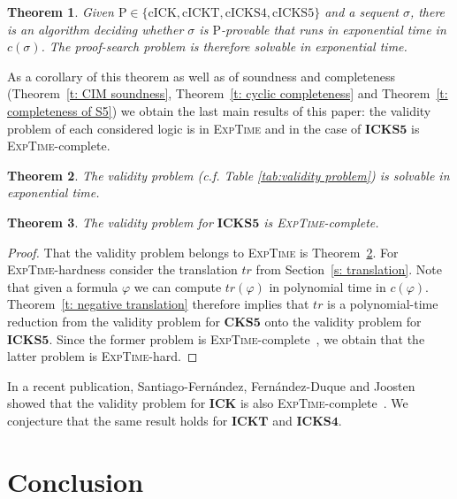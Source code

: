 \documentclass{myifcolog}
\newcommand{\hickp}{\mathrm{P}}
\newcommand{\cick}{\mathrm{cICK}}
\newcommand{\cickt}{\mathrm{cICKT}}
\newcommand{\cicks}{\mathrm{cICKS4}}
\newcommand{\cickss}{\mathrm{cICKS5}}
\newtheorem{theorem}{Theorem}
\numberwithin{theorem}{section}
\begin{document}
   \begin{theorem}
       Given $\hickp \in \{\cick, \cickt, \cicks, \cickss\}$ and a sequent $\sigma$, there is an algorithm deciding whether $\sigma$ is $\hickp$-provable that runs in exponential time in $c(\sigma)$. The proof-search problem is therefore solvable in exponential time.
   \end{theorem}
As a corollary of this theorem as well as of soundness and completeness (Theorem~\ref{t: CIM soundness}, Theorem~\ref{t: cyclic completeness} and Theorem~\ref{t: completeness of S5}) we obtain the last main results of this paper: the validity problem of each considered logic is in \textsc{ExpTime} and in the case of $\mathbf{ICKS5}$ is \textsc{ExpTime}-complete.

\begin{theorem}\label{t: validity problem is Exptime}
    The validity problem (c.f. Table \ref{tab:validity problem}) is solvable in exponential time.
\end{theorem}


\begin{theorem}
    The validity problem for $\mathbf{ICKS5}$ is \textsc{ExpTime}-complete.
\end{theorem}
\begin{proof}
    That the validity problem belongs to \textsc{ExpTime} is Theorem~\ref{t: validity problem is Exptime}. For \textsc{ExpTime}-hardness consider the translation $tr$ from Section~\ref{s: translation}. Note that given a formula $\varphi$ we can compute $tr(\varphi)$ in polynomial time in $c(\varphi)$. Theorem~\ref{t: negative translation} therefore implies that $tr$ is a polynomial-time reduction from the validity problem for $\mathbf{CKS5}$ onto the validity problem for $\mathbf{ICKS5}$. Since the former problem is \textsc{ExpTime}-complete~\cite{halpern_1992}, we obtain that the latter problem is \textsc{ExpTime}-hard.
\end{proof}

In a recent publication, Santiago-Fern{\'a}ndez, Fern{\'a}ndez-Duque and Joosten showed that the validity problem for $\mathbf{ICK}$ is also \textsc{ExpTime}-complete~\cite{Fernandez-Duque_complexity_2025}. We conjecture that the same result holds for $\mathbf{ICKT}$ and $\mathbf{ICKS4}$.

\section{Conclusion}\label{s: conclusion}
\end{document}
